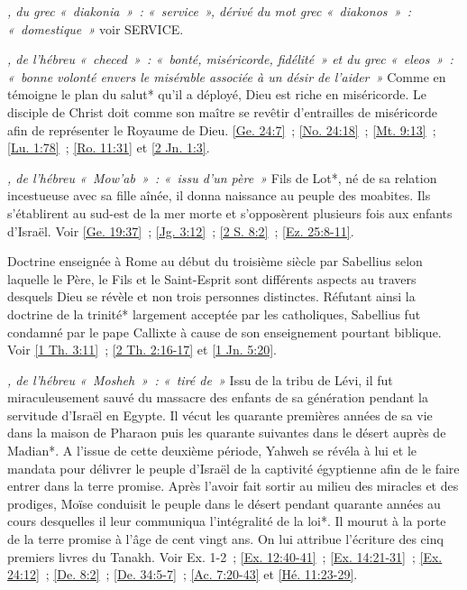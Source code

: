 \begin{multicols}{2}
\textit{, du grec «~diakonia~»~: «~service~», dérivé du mot grec «~diakonos~»~: «~domestique~»}\newline
voir SERVICE. 

\textit{, de l'hébreu «~checed~»~: «~bonté, miséricorde, fidélité~» et du grec «~eleos~»~: «~bonne volonté envers le misérable associée à un désir de l'aider~»}\newline
Comme en témoigne le plan du salut* qu'il a déployé, Dieu est riche en miséricorde. Le disciple de Christ doit comme son maître se revêtir d'entrailles de miséricorde afin de représenter le Royaume de Dieu. \vref{Ge. 24:7}~; \vref{No. 24:18}~; \vref{Mt. 9:13}~; \vref{Lu. 1:78}~; \vref{Ro. 11:31} et \vref{2 Jn. 1:3}.

\textit{, de l'hébreu «~Mow'ab~»~: «~issu d'un père~»}\newline
Fils de Lot*, né de sa relation incestueuse avec sa fille aînée, il donna naissance au peuple des moabites. Ils s'établirent au sud-est de la mer morte et s'opposèrent plusieurs fois aux enfants d'Israël. Voir \vref{Ge. 19:37}~; \vref{Jg. 3:12}~; \vref{2 S. 8:2}~; \vref{Ez. 25:8-11}.

\textit{}\newline
Doctrine enseignée à Rome au début du troisième siècle par Sabellius selon laquelle le Père, le Fils et le Saint-Esprit sont différents aspects au travers desquels Dieu se révèle et non trois personnes distinctes. Réfutant ainsi la doctrine de la trinité* largement acceptée par les catholiques, Sabellius fut condamné par le pape Callixte à cause de son enseignement pourtant biblique. Voir \vref{1 Th. 3:11}~; \vref{2 Th. 2:16-17} et \vref{1 Jn. 5:20}.

\textit{, de l'hébreu «~Mosheh~»~: «~tiré de~»}\newline
Issu de la tribu de Lévi, il fut miraculeusement sauvé du massacre des enfants de sa génération pendant la servitude d'Israël en Egypte. Il vécut les quarante premières années de sa vie dans la maison de Pharaon puis les quarante suivantes dans le désert auprès de Madian*. A l'issue de cette deuxième période, Yahweh se révéla à lui et le mandata pour délivrer le peuple d'Israël de la captivité égyptienne afin de le faire entrer dans la terre promise. Après l'avoir fait sortir au milieu des miracles et des prodiges, Moïse conduisit le peuple dans le désert pendant quarante années au cours desquelles il leur communiqua l'intégralité de la loi*. Il mourut à la porte de la terre promise à l'âge de cent vingt ans. On lui attribue l'écriture des cinq premiers livres du Tanakh. Voir Ex. 1-2~; \vref{Ex. 12:40-41}~; \vref{Ex. 14:21-31}~; \vref{Ex. 24:12}~; \vref{De. 8:2}~; \vref{De. 34:5-7}~; \vref{Ac. 7:20-43} et \vref{Hé. 11:23-29}.


\end{multicols}
